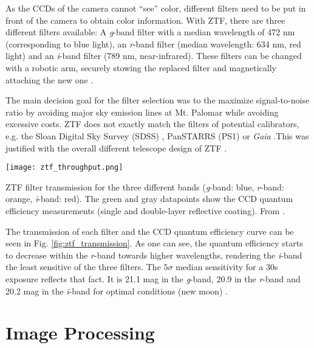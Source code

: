 As the CCDs of the camera cannot ``see'' color, different filters need to be put in front of the camera to obtain color information. With ZTF, there are three different filters available: A \textit{g}-band filter with a median wavelength of 472 nm (corresponding to blue light), an \textit{r}-band filter (median wavelength: 634 nm, red light) and an \textit{i}-band filter (789 nm, near-infrared). These filters can be changed with a robotic arm, securely stowing the replaced filter and magnetically attaching the new one \cite{Dekany2020}.

The main decision goal for the filter selection was to the maximize signal-to-noise ratio by avoiding major sky emission lines at Mt. Palomar while avoiding excessive costs. ZTF does not exactly match the filters of potential calibrators, e.g. the Sloan Digital Sky Survey (SDSS) , PanSTARRS (PS1)  or \textit{Gaia} .\newpage This was justified with the overall different telescope design of ZTF \cite{Bellm2019}.

\begin{marginfigure}
    \texttt{[image: ztf\_throughput.png]}
    \caption[ZTF Filter Transmission]{ZTF filter transmission for the three different bands (\textit{g}-band: blue, \textit{r}-band: orange, \textit{i}-band: red). The green and gray datapoints show the CCD quantum efficiency measurements (single and double-layer reflective coating). From \cite{Bellm2019}.}
\end{marginfigure}

The transmission of each filter and the CCD quantum efficiency curve can be seen in Fig. \ref{fig:ztf_transmission}. As one can see, the quantum efficiency starts to decrease within the \textit{r}-band towards higher wavelengths, rendering the \textit{i}-band the least sensitive of the three filters. The $5\sigma$ median sensitivity for a 30s exposure reflects that fact. It is 21.1 mag in the \textit{g}-band, 20.9 in the \textit{r}-band and 20.2 mag in the \textit{i}-band for optimal conditions (new moon) \cite{Bellm2019}.



\section{Image Processing}
